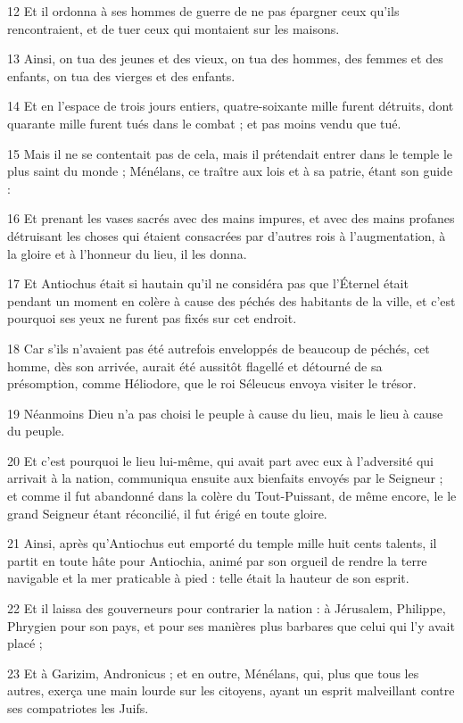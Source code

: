 \par 12 Et il ordonna à ses hommes de guerre de ne pas épargner ceux qu'ils rencontraient, et de tuer ceux qui montaient sur les maisons.
\par 13 Ainsi, on tua des jeunes et des vieux, on tua des hommes, des femmes et des enfants, on tua des vierges et des enfants.
\par 14 Et en l'espace de trois jours entiers, quatre-soixante mille furent détruits, dont quarante mille furent tués dans le combat ; et pas moins vendu que tué.
\par 15 Mais il ne se contentait pas de cela, mais il prétendait entrer dans le temple le plus saint du monde ; Ménélans, ce traître aux lois et à sa patrie, étant son guide :
\par 16 Et prenant les vases sacrés avec des mains impures, et avec des mains profanes détruisant les choses qui étaient consacrées par d'autres rois à l'augmentation, à la gloire et à l'honneur du lieu, il les donna.
\par 17 Et Antiochus était si hautain qu'il ne considéra pas que l'Éternel était pendant un moment en colère à cause des péchés des habitants de la ville, et c'est pourquoi ses yeux ne furent pas fixés sur cet endroit.
\par 18 Car s'ils n'avaient pas été autrefois enveloppés de beaucoup de péchés, cet homme, dès son arrivée, aurait été aussitôt flagellé et détourné de sa présomption, comme Héliodore, que le roi Séleucus envoya visiter le trésor.
\par 19 Néanmoins Dieu n'a pas choisi le peuple à cause du lieu, mais le lieu à cause du peuple.
\par 20 Et c'est pourquoi le lieu lui-même, qui avait part avec eux à l'adversité qui arrivait à la nation, communiqua ensuite aux bienfaits envoyés par le Seigneur ; et comme il fut abandonné dans la colère du Tout-Puissant, de même encore, le le grand Seigneur étant réconcilié, il fut érigé en toute gloire.
\par 21 Ainsi, après qu'Antiochus eut emporté du temple mille huit cents talents, il partit en toute hâte pour Antiochia, animé par son orgueil de rendre la terre navigable et la mer praticable à pied : telle était la hauteur de son esprit.
\par 22 Et il laissa des gouverneurs pour contrarier la nation : à Jérusalem, Philippe, Phrygien pour son pays, et pour ses manières plus barbares que celui qui l'y avait placé ;
\par 23 Et à Garizim, Andronicus ; et en outre, Ménélans, qui, plus que tous les autres, exerça une main lourde sur les citoyens, ayant un esprit malveillant contre ses compatriotes les Juifs.
